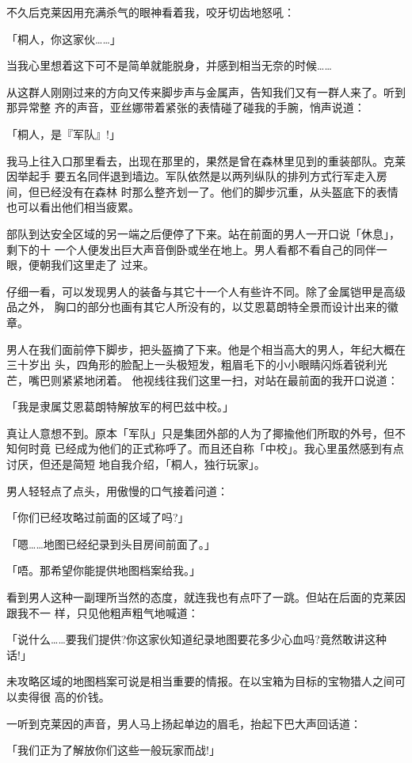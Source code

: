 \documentclass[11pt]{book}
\begin{document}
不久后克莱因用充满杀气的眼神看着我，咬牙切齿地怒吼：

「桐人，你这家伙……」

当我心里想着这下可不是简单就能脱身，并感到相当无奈的时候……

从这群人刚刚过来的方向又传来脚步声与金属声，告知我们又有一群人来了。听到那异常整
齐的声音，亚丝娜带着紧张的表情碰了碰我的手腕，悄声说道：

「桐人，是『军队』!」

我马上往入口那里看去，出现在那里的，果然是曾在森林里见到的重装部队。克莱因举起手
要五名同伴退到墙边。军队依然是以两列纵队的排列方式行军走入房间，但已经没有在森林
时那么整齐划一了。他们的脚步沉重，从头盔底下的表情也可以看出他们相当疲累。

部队到达安全区域的另一端之后便停了下来。站在前面的男人一开口说「休息」，剩下的十
一个人便发出巨大声音倒卧或坐在地上。男人看都不看自己的同伴一眼，便朝我们这里走了
过来。

仔细一看，可以发现男人的装备与其它十一个人有些许不同。除了金属铠甲是高级品之外，
胸口的部分也画有其它人所没有的，以艾恩葛朗特全景而设计出来的徽章。

男人在我们面前停下脚步，把头盔摘了下来。他是个相当高大的男人，年纪大概在三十岁出
头，四角形的脸配上一头极短发，粗眉毛下的小小眼睛闪烁着锐利光芒，嘴巴则紧紧地闭着。
他视线往我们这里一扫，对站在最前面的我开口说道：

「我是隶属艾恩葛朗特解放军的柯巴兹中校。」

真让人意想不到。原本「军队」只是集团外部的人为了揶揄他们所取的外号，但不知何时竟
已经成为他们的正式称呼了。而且还自称「中校」。我心里虽然感到有点讨厌，但还是简短
地自我介绍，「桐人，独行玩家」。

男人轻轻点了点头，用傲慢的口气接着问道：

「你们已经攻略过前面的区域了吗?」

「嗯……地图已经纪录到头目房间前面了。」

「唔。那希望你能提供地图档案给我。」

看到男人这种一副理所当然的态度，就连我也有点吓了一跳。但站在后面的克莱因跟我不一
样，只见他粗声粗气地喊道：

「说什么……要我们提供?你这家伙知道纪录地图要花多少心血吗?竟然敢讲这种话!」

未攻略区域的地图档案可说是相当重要的情报。在以宝箱为目标的宝物猎人之间可以卖得很
高的价钱。

一听到克莱因的声音，男人马上扬起单边的眉毛，抬起下巴大声回话道：

「我们正为了解放你们这些一般玩家而战!」
\end{document}
